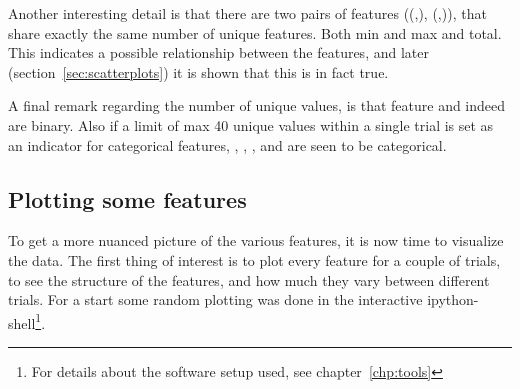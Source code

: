 Another interesting detail is that there are two pairs of features ((,), (,)), that share exactly the same number of unique features. Both min and max and total. This indicates a possible relationship between the features, and later (section~\ref{sec:scatterplots}) it is shown that this is in fact true. \par

A final remark regarding the number of unique values, is that feature  and  indeed are binary. Also if a limit of max 40 unique values within a single trial is set as an indicator for categorical features, , , ,  and  are seen to be categorical. \par

\subsection{Plotting some features}\label{sec:plotting-features}
To get a more nuanced picture of the various features, it is now time to visualize the data. The first thing of interest is to plot every feature for a couple of trials, to see the structure of the features, and how much they vary between different trials. For a start some random plotting was done in the interactive ipython-shell\footnote{For details about the software setup used, see chapter~\ref{chp:tools}}. \par
